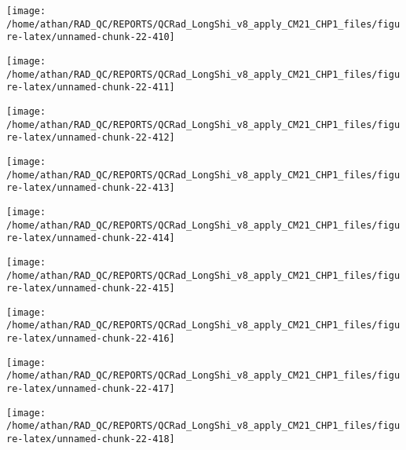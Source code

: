 \documentclass[
  10pt,
  a4paper,oneside]{article}
\begin{document}
\begin{center}\texttt{[image: /home/athan/RAD\_QC/REPORTS/QCRad\_LongShi\_v8\_apply\_CM21\_CHP1\_files/figure-latex/unnamed-chunk-22-410]} \end{center}

\begin{center}\texttt{[image: /home/athan/RAD\_QC/REPORTS/QCRad\_LongShi\_v8\_apply\_CM21\_CHP1\_files/figure-latex/unnamed-chunk-22-411]} \end{center}

\begin{center}\texttt{[image: /home/athan/RAD\_QC/REPORTS/QCRad\_LongShi\_v8\_apply\_CM21\_CHP1\_files/figure-latex/unnamed-chunk-22-412]} \end{center}

\begin{center}\texttt{[image: /home/athan/RAD\_QC/REPORTS/QCRad\_LongShi\_v8\_apply\_CM21\_CHP1\_files/figure-latex/unnamed-chunk-22-413]} \end{center}

\begin{center}\texttt{[image: /home/athan/RAD\_QC/REPORTS/QCRad\_LongShi\_v8\_apply\_CM21\_CHP1\_files/figure-latex/unnamed-chunk-22-414]} \end{center}

\begin{center}\texttt{[image: /home/athan/RAD\_QC/REPORTS/QCRad\_LongShi\_v8\_apply\_CM21\_CHP1\_files/figure-latex/unnamed-chunk-22-415]} \end{center}

\begin{center}\texttt{[image: /home/athan/RAD\_QC/REPORTS/QCRad\_LongShi\_v8\_apply\_CM21\_CHP1\_files/figure-latex/unnamed-chunk-22-416]} \end{center}

\begin{center}\texttt{[image: /home/athan/RAD\_QC/REPORTS/QCRad\_LongShi\_v8\_apply\_CM21\_CHP1\_files/figure-latex/unnamed-chunk-22-417]} \end{center}

\begin{center}\texttt{[image: /home/athan/RAD\_QC/REPORTS/QCRad\_LongShi\_v8\_apply\_CM21\_CHP1\_files/figure-latex/unnamed-chunk-22-418]} \end{center}
\end{document}

